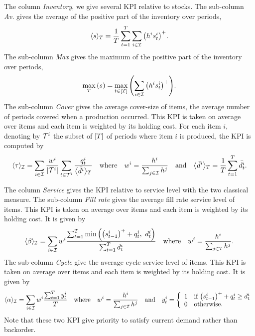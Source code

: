 The column \emph{Inventory}, we give several KPI relative to stocks.
The sub-column \emph{Av.} gives the average of the positive part of the inventory over periods, \ie
\begin{equation}
  \left<\inventory\right>_{\horizon} = \frac{1}{\horizon}\sum_{t=1}^{\horizon}\sum_{i\in\REF} \bracket{\holding^i\inventory_t^i}^+.
\end{equation}
The sub-column \emph{Max} gives the maximum of the positive part of the inventory over periods, \ie
\begin{equation}
  \max_{\horizon}\bracket{\inventory} = \max_{t\in\range{\horizon}}\bracket{\sum_{i\in\REF} \bracket{\holding^i\inventory_t^i}^+}.
\end{equation}
The sub-column \emph{Cover} gives the average cover-size of items, \ie the average number of periods covered when a production occurred.
This KPI is taken on average over items and each item is weighted by its holding cost.
For each item $i$, denoting by $\mathcal{T}^i$ the subset of $\range{\horizon}$ of periods where item $i$ is produced, the KPI is computed by
\begin{equation}\label{eq:pdp:numerical-experiments:KPI:cover}
  \left<\cover\right>_{\REF}
  = \sum_{i\in\REF} \frac{w^i}{\card{\cT^i}}\sum_{t\in\cT^i} \frac{\quantity_t^i}{\left<\bar{\demand}^i\right>_{\horizon}}
  \quad\mbox{where}\quad
  w^i=\frac{\holding^i}{\sum_{j\in\REF}\holding^j}
  \quad\mbox{and}\quad
  \left<\bar{\demand}^i\right>_{\horizon}=\frac{1}{\horizon}\sum_{t=1}^{\horizon} \bar{\demand_t^i}.
\end{equation}


The column \emph{Service} gives the KPI relative to service level with the two classical measure.
The sub-column \emph{Fill rate} gives the average fill rate service level of items.
This KPI is taken on average over items and each item is weighted by its holding cost.
It is given by
\begin{equation}\label{eq:pdp:numerical-experiments:KPI:fill-rate-service-level}
  \left<\beta\right>_{\REF} = \sum_{i\in\REF} w^i \frac{\sum_{t=1}^{\horizon}\min\bracket{\bracket{\inventory_{t-1}^i}^++\quantity_t^i,\ \demand_t^i}}{\sum_{t=1}^{\horizon}\demand_t^i}
  \quad\mbox{where}\quad
  w^i=\frac{\holding^i}{\sum_{j\in\REF}\holding^j}.
\end{equation}
The sub-column \emph{Cycle} give the average cycle service level of items.
This KPI is taken on average over items and each item is weighted by its holding cost.
It is given by
\begin{equation}\label{eq:pdp:numerical-experiments:KPI:cycle-service-level}
  \left<\alpha\right>_{\REF} = \sum_{i\in\REF} w^i\frac{\sum_{t=1}^{\horizon} y_t^i}{\horizon}
  \quad\mbox{where}\quad
  w^i=\frac{\holding^i}{\sum_{j\in\REF}\holding^j}
  \quad\mbox{and}\quad
  y_t^i =
  \left\{
  \begin{array}{ll}
  1 & \mbox{if}\ \bracket{\inventory_{t-1}^i}^++\quantity_t^i\ge\demand_t^i \\
  0 & \mbox{otherwise}.
  \end{array}
  \right.
\end{equation}
Note that these two KPI give priority to satisfy current demand rather than backorder.


